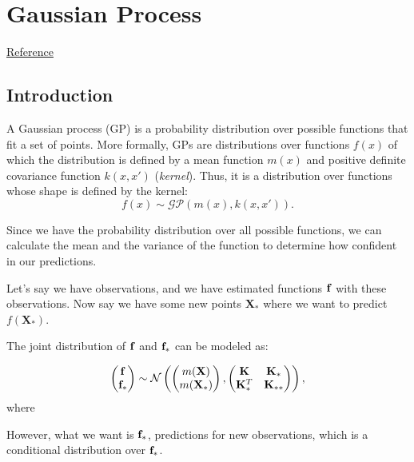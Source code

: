 \chapter{Gaussian Process}
\href{https://github.com/jwangjie/Gaussian-Process-Regression-Tutorial}{Reference}


\section{Introduction}
\label{sec:gaussian_process}
A Gaussian process (GP) is a probability distribution over possible functions that fit a set of points. More formally, GPs are distributions over functions $f(x)$ of which the distribution is defined by a mean function $m(x)$ and positive definite covariance function $k(x,x')$ (\ie \textit{kernel}). Thus, it is a distribution over functions whose shape is defined by the kernel:
$$f(x) \sim \mathcal{GP}(m(x),k(x,x')).$$

Since we have the probability distribution over all possible functions, we can calculate the mean and the variance of the function to determine how confident in our predictions.

Let's say we have observations, and we have estimated functions ${\mathbf{f}}$ with these observations. Now say we have some new points $\mathbf{X}_*$ where we want to predict $f(\mathbf{X}_*)$.

The joint distribution of ${\mathbf{f}}$ and ${\mathbf{f}}_*$ can be modeled as:

\begin{align*}
	\begin{pmatrix}
		{\mathbf{f}}\\
		{\mathbf{f}}_*
		\end{pmatrix}\sim \mathcal{N} 
		\begin{pmatrix}
		\begin{pmatrix}
			m(\mathbf{X})\\
			m(\mathbf{X}_*)
		\end{pmatrix},
		\begin{pmatrix}
			\mathbf{K} & \mathbf{K}_*\\
			\mathbf{K}_*^T & \mathbf{K}_{**}
		\end{pmatrix}
		\end{pmatrix},
\end{align*}
where 

However, what we want is ${\mathbf{f}}_*$, predictions for new observations, which is a conditional distribution over ${\mathbf{f}}_*$. 




